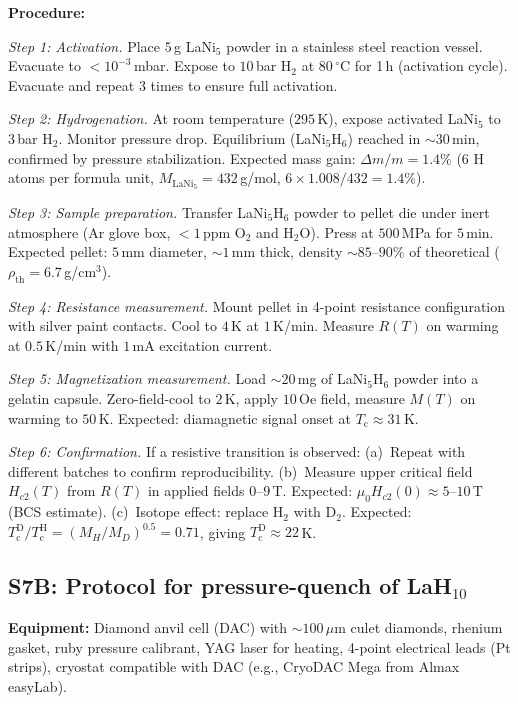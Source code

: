 \documentclass[prb,twocolumn,superscriptaddress,longbibliography,floatfix]{revtex4-2}
\newcommand{\Tc}{T_{\mathrm{c}}}
\begin{document}
\textbf{Procedure:}

\emph{Step 1: Activation.}
Place $5\,$g LaNi$_5$ powder in a stainless steel reaction vessel.
Evacuate to $<10^{-3}\,$mbar.  Expose to $10\,$bar H$_2$ at
$80\,^\circ$C for 1\,h (activation cycle).  Evacuate and repeat
3 times to ensure full activation.

\emph{Step 2: Hydrogenation.}
At room temperature ($295\,$K), expose activated LaNi$_5$ to
$3\,$bar H$_2$.  Monitor pressure drop.  Equilibrium
(LaNi$_5$H$_6$) reached in $\sim 30\,$min, confirmed by
pressure stabilization.  Expected mass gain: $\Delta m/m = 1.4\%$
(6 H atoms per formula unit, $M_{\mathrm{LaNi}_5} = 432\,$g/mol,
$6 \times 1.008 / 432 = 1.4\%$).

\emph{Step 3: Sample preparation.}
Transfer LaNi$_5$H$_6$ powder to pellet die under inert
atmosphere (Ar glove box, $<1\,$ppm O$_2$ and H$_2$O).
Press at $500\,$MPa for $5\,$min.  Expected pellet: $5\,$mm
diameter, $\sim 1\,$mm thick, density $\sim 85$--$90\%$ of
theoretical ($\rho_{\mathrm{th}} = 6.7\,$g/cm$^3$).

\emph{Step 4: Resistance measurement.}
Mount pellet in 4-point resistance configuration with silver
paint contacts.  Cool to $4\,$K at $1\,$K/min.  Measure $R(T)$
on warming at $0.5\,$K/min with $1\,$mA excitation current.

\emph{Step 5: Magnetization measurement.}
Load $\sim 20\,$mg of LaNi$_5$H$_6$ powder into a gelatin
capsule.  Zero-field-cool to $2\,$K, apply $10\,$Oe field,
measure $M(T)$ on warming to $50\,$K.  Expected: diamagnetic
signal onset at $\Tc \approx 31\,$K.

\emph{Step 6: Confirmation.}
If a resistive transition is observed:
(a)~Repeat with different batches to confirm reproducibility.
(b)~Measure upper critical field $H_{c2}(T)$ from $R(T)$ in
applied fields $0$--$9\,$T.  Expected:
$\mu_0 H_{c2}(0) \approx 5$--$10\,$T (BCS estimate).
(c)~Isotope effect: replace H$_2$ with D$_2$.
Expected: $\Tc^{\mathrm{D}}/\Tc^{\mathrm{H}} = (M_H/M_D)^{0.5}
= 0.71$, giving $\Tc^{\mathrm{D}} \approx 22\,$K.

\subsection{S7B: Protocol for pressure-quench of LaH$_{10}$}

\textbf{Equipment:}
Diamond anvil cell (DAC) with $\sim 100\,\mu$m culet diamonds,
rhenium gasket, ruby pressure calibrant, YAG laser for heating,
4-point electrical leads (Pt strips), cryostat compatible with
DAC (e.g., CryoDAC Mega from Almax easyLab).
\end{document}
